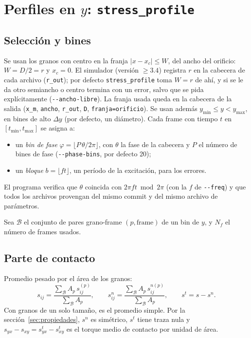 \documentclass[11pt,a4paper]{article}
\newcommand{\code}[1]{\texttt{#1}}
\begin{document}
\section{Perfiles en \texorpdfstring{$y$}{y}: \code{stress\_profile}}
\label{sec:perfiles}

\subsection{Selección y bines}

Se usan los granos con centro en la franja $|x - x_c| \le W$, del ancho
del orificio: $W = D/2 = r$ y $x_c = 0$. El simulador (versión $\ge 3.4$)
registra $r$ en la cabecera de cada archivo (\code{r\_out}); por defecto
\code{stress\_profile} toma $W = r$ de ahí, y si se le da otro semiancho o
centro termina con un error, salvo que se pida explícitamente
(\code{-{}-ancho-libre}). La franja usada queda en la cabecera de la salida
(\code{x\_m}, \code{ancho}, \code{r\_out}, \code{D},
\code{franja=orificio}). Se usan además $y_\text{min} \le y < y_\text{max}$, en bines de alto
$\Delta y$ (por defecto, un diámetro). Cada frame con tiempo $t$ en
$[t_\text{min}, t_\text{max}]$ se asigna a:
\begin{itemize}
  \item un \emph{bin de fase} $\varphi = \lfloor P \, \theta / 2\pi
    \rfloor$, con $\theta$ la fase de la cabecera y $P$ el número de bines
    de fase (\code{-{}-phase-bins}, por defecto 20);
  \item un \emph{bloque} $b = \lfloor f t \rfloor$, un período de la
    excitación, para los errores.
\end{itemize}
El programa verifica que $\theta$ coincida con $2\pi f t \bmod 2\pi$ (con
la $f$ de \code{-{}-freq}) y que todos los archivos provengan del mismo
commit y del mismo archivo de parámetros.

Sea $\mathcal{B}$ el conjunto de pares grano-frame $(p, \text{frame})$ de
un bin de $y$, y $N_f$ el número de frames usados.

\subsection{Parte de contacto}

Promedio pesado por el área de los granos:
\begin{equation}
  s_{ij} = \frac{\sum_{\mathcal{B}} A_p \, s^{(p)}_{ij}}
                {\sum_{\mathcal{B}} A_p},
  \qquad
  s^n_{ij} = \frac{\sum_{\mathcal{B}} A_p \, s^{n(p)}_{ij}}
                  {\sum_{\mathcal{B}} A_p},
  \qquad
  s^t = s - s^n .
\end{equation}
Con granos de un solo tamaño, es el promedio simple. Por la
sección~\ref{sec:propiedades}, $s^n$ es simétrico, $s^t$ tiene traza nula y
$s_{yx} - s_{xy} = s^t_{yx} - s^t_{xy}$ es el torque medio de contacto por
unidad de área.
\end{document}
